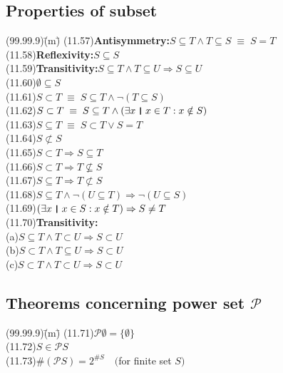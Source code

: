 \documentclass{amsart}
\newcommand{\lgap}{2pt}                             %
\newcommand{\equivs}{\ensuremath{\;\equiv\;}}       %
\newcommand{\impl}{\ensuremath{\Rightarrow}}        %
\newcommand{\thedr}{\rule[-.25ex]{.32mm}{1.75ex}}   %
\newcommand{\dr}{\;\,\thedr\,\;}                    %
\newcommand{\rb}{:}                                 %
\newcommand{\ext}{\exists}                          %
\begin{document}
\subsection*{Properties of subset}
\begin{tabbing}
(99.99.9)\;\=(m)\;\=\kill
(11.57)\>\textbf{Antisymmetry:}\quad $S\subseteq T\land T\subseteq S \equivs S = T$\\[\lgap]
(11.58)\>\textbf{Reflexivity:}\quad $S\subseteq S$\\[\lgap]
(11.59)\>\textbf{Transitivity:}\quad $S\subseteq T\land T\subseteq U\impl S\subseteq U$\\[\lgap]
(11.60)\>$\emptyset \subseteq S$\\[\lgap]
(11.61)\>$S\subset T \equivs S\subseteq T\land \neg (T\subseteq S)$\\[\lgap]
(11.62)\>$S\subset T \equivs S\subseteq T\land (\ext x\dr x\in T\rb x\notin S)$\\[\lgap]
(11.63)\>$S\subseteq T \equivs S\subset T\lor S = T$\\[\lgap]
(11.64)\>$S\not\subset S$\\[\lgap]
(11.65)\>$S\subset T\impl S\subseteq T$\\[\lgap]
(11.66)\>$S\subset T\impl T\nsubseteq S$\\[\lgap]
(11.67)\>$S\subseteq T\impl T\not\subset S$\\[\lgap]
(11.68)\>$S\subseteq T\land \neg(U\subseteq T)\impl \neg (U\subseteq S)$\\[\lgap]
(11.69)\>$(\ext x\dr x\in S\rb x\notin T)\impl S\ne T$\\[\lgap]
(11.70)\>\textbf{Transitivity:}\\[\lgap]
           \>(a)\>$S\subseteq T\land T\subset U\impl S\subset U$\\[\lgap]
           \>(b)\>$S\subset T\land T\subseteq U\impl S\subset U$\\[\lgap]
           \>(c)\>$S\subset T\land T\subset U\impl S\subset U$\\[\lgap]
\end{tabbing}

\subsection*{Theorems concerning power set $\mathcal{P}$}
\begin{tabbing}
(99.99.9)\;\=(m)\;\=\kill
(11.71)\>$\mathcal{P}\emptyset = \{\emptyset\}$\\[\lgap]
(11.72)\>$S\in \mathcal{P}S$\\[\lgap]
(11.73)\>$\# (\mathcal{P}S) = 2^{\# S}\quad ($for finite set $S)$\\[\lgap]
\end{tabbing}
\end{document}
